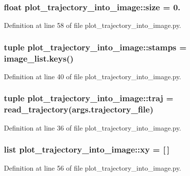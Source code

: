 \subsubsection[{size}]{\setlength{\rightskip}{0pt plus 5cm}float {\bf plot\-\_\-trajectory\-\_\-into\-\_\-image\-::size} = 0.}\label{namespaceplot__trajectory__into__image_aa273ad545f0ed944604b30bc41e98efd}


\-Definition at line 58 of file plot\-\_\-trajectory\-\_\-into\-\_\-image.\-py.

\subsubsection[{stamps}]{\setlength{\rightskip}{0pt plus 5cm}tuple {\bf plot\-\_\-trajectory\-\_\-into\-\_\-image\-::stamps} = image\-\_\-list.\-keys()}\label{namespaceplot__trajectory__into__image_ae63f684f05556dd6102c6c592f209680}


\-Definition at line 40 of file plot\-\_\-trajectory\-\_\-into\-\_\-image.\-py.

\subsubsection[{traj}]{\setlength{\rightskip}{0pt plus 5cm}tuple {\bf plot\-\_\-trajectory\-\_\-into\-\_\-image\-::traj} = read\-\_\-trajectory(args.\-trajectory\-\_\-file)}\label{namespaceplot__trajectory__into__image_a231028885b6c1eb04c71e551420f0d99}


\-Definition at line 36 of file plot\-\_\-trajectory\-\_\-into\-\_\-image.\-py.

\subsubsection[{xy}]{\setlength{\rightskip}{0pt plus 5cm}list {\bf plot\-\_\-trajectory\-\_\-into\-\_\-image\-::xy} = [$\,$]}\label{namespaceplot__trajectory__into__image_ae433611930ba3f714a9b59521aea9ae6}


\-Definition at line 56 of file plot\-\_\-trajectory\-\_\-into\-\_\-image.\-py.

